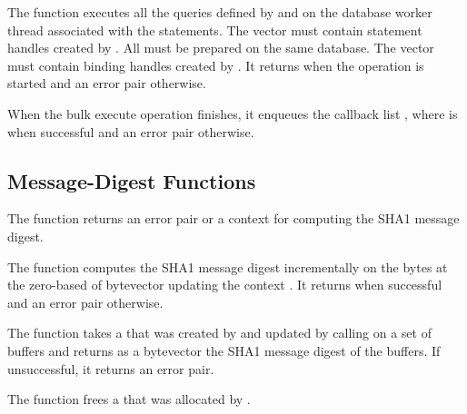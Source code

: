 The  function executes all the queries
defined by  and  on the database worker
thread associated with the statements. The vector 
must contain statement handles created by
. All  must be prepared
on the same database. The vector  must contain binding
handles created by . It returns
 when the operation is started and an error pair otherwise.

When the bulk execute operation finishes, it enqueues the callback
list , where  is
 when successful and an error pair otherwise.

\subsection {Message-Digest Functions}

\begin{function}
\end{function}

The  function returns an error pair
or a context for computing the SHA1 message digest.

\begin{function}
\end{function}

The  function computes the SHA1 message digest
incrementally on the  bytes at the zero-based 
of bytevector  updating the context .
It returns  when successful and an error pair otherwise.

\begin{function}
\end{function}

The  function takes a  that was created by
 and updated by calling  on a set
of buffers and returns as a bytevector the SHA1 message digest of the buffers.
If unsuccessful, it returns an error pair.

\begin{function}
\end{function}

The  function frees a 
that was allocated by .
